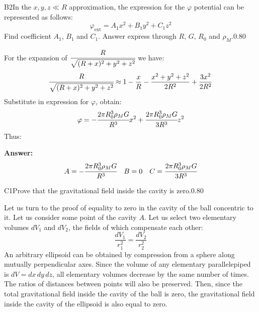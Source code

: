 \documentclass[11pt,a4paper]{article}
\begin{document}
\begin{solcard}{B2}{In the $x,y,z\ll{R}$ approximation, the expression for the $\varphi$ potential can be represented as follows: $$\varphi_{\text{ext}}=A_1x^2+B_1y^2+C_1z^2 $$ Find coefficient $A_1$, $B_1$ and $C_1$. Answer express through $R$, $G$, $R_0$ and $\rho_M$.}{0.80}

For the expansion of $\cfrac{R}{\sqrt{(R+x)^2+y^2+z^2}}$ we have: $$\cfrac{R}{\sqrt{(R+x)^2+y^2+z^2}}\approx{1-\frac{x}{R}-\frac{x^2+y^2+z^2}{2R^2}}+\frac{3x^2}{2R^2} $$ Substitute in expression for $\varphi$, obtain: $$\varphi=-\cfrac{2\pi R^3_0\rho_MG}{R^3}x^2+\cfrac{2\pi R^3_0\rho_MG}{3R^3}z^2 $$ Thus:

\par\smallskip\noindent\textbf{Answer:} $$A=-\cfrac{2\pi R^3_0\rho_MG}{R^3} \quad B=0 \quad C=\cfrac{2\pi R^3_0\rho_MG}{3R^3} $$
\end{solcard}

\begin{solcard}{C1}{Prove that the gravitational field inside the cavity is zero.}{0.80}

Let us turn to the proof of equality to zero in the cavity of the ball concentric to it. Let us consider some point of the cavity $A$. Let us select two elementary volumes $dV_1$ and $dV_2$, the fields of which compensate each other: $$\frac{dV_1}{r^2_1}=\frac{dV_2}{r^2_2} $$ An arbitrary ellipsoid can be obtained by compression from a sphere along mutually perpendicular axes. Since the volume of any elementary parallelepiped is $dV = dx\,dy\,dz$, all elementary volumes decrease by the same number of times. The ratios of distances between points will also be preserved. Then, since the total gravitational field inside the cavity of the ball is zero, the gravitational field inside the cavity of the ellipsoid is also equal to zero.

\end{solcard}
\end{document}
